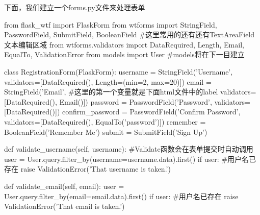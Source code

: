       下面，我们建立一个forms.py文件来处理表单
      \begin{codeblock}[language=python, caption={form.py}]
        from flask_wtf import FlaskForm
        from wtforms import StringField, PasswordField, SubmitField, BooleanField
            #这里常用的还有还有TextAreaField文本编辑区域
        from wtforms.validators import DataRequired, Length, Email, EqualTo, ValidationError
        from models import User #models将在下一目建立

        class RegistrationForm(FlaskForm):
            username = StringField('Username', validators=[DataRequired(), Length=(min=2, max=20)])
            email = StringField('Email', #这里的第一个变量就是下面html文件中的label
                                validators=[DataRequired(), Email()])
            password = PasswordField('Password', validators=[DataRequired()])
            confirm_password = PasswordField('Confirm Password', 
                                              validators=[DataRequired(), EqualTo('password')])
            remember = BooleanField('Remember Me')
            submit = SubmitField('Sign Up')

            def validate_username(self, username): #Validate函数会在表单提交时自动调用
                user = User.query.filter_by(username=username.data).first()
                if user: #用户名已存在
                    raise ValidationError('That username is taken.')

            def validate_email(self, email):
                user = User.query.filter_by(email=email.data).first()
                if user: #用户名已存在
                    raise ValidationError('That email is taken.')
      \end{codeblock}

